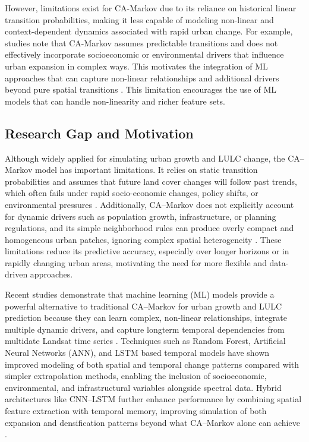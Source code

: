 \documentclass[main]{subfiles}
\begin{document}
However, limitations exist for CA-Markov due to its reliance on historical linear transition probabilities, making it less capable of modeling non-linear and context-dependent dynamics associated with rapid urban change. For example, studies note that CA-Markov assumes predictable transitions and does not effectively incorporate socioeconomic or environmental drivers that influence urban expansion in complex ways. This motivates the integration of ML approaches that can capture non-linear relationships and additional drivers beyond pure spatial transitions \cite{ZHAO2024129}.
This limitation encourages the use of ML models that can handle non-linearity and richer feature sets.

\subsection*{Research Gap and Motivation}

Although widely applied for simulating urban growth and LULC change, the CA–Markov model has important limitations. It relies on static transition probabilities and assumes that future land cover changes will follow past trends, which often fails under rapid socio-economic changes, policy shifts, or environmental pressures \cite{ZHAO2024129}. Additionally, CA–Markov does not explicitly account for dynamic drivers such as population growth, infrastructure, or planning regulations, and its simple neighborhood rules can produce overly compact and homogeneous urban patches, ignoring complex spatial heterogeneity \cite{10.11648/j.ajese.20250904.12}. These limitations reduce its predictive accuracy, especially over longer horizons or in rapidly changing urban areas, motivating the need for more flexible and data-driven approaches.

Recent studies demonstrate that machine learning (ML) models provide a powerful alternative to traditional CA–Markov for urban growth and LULC prediction because they can learn complex, non-linear relationships, integrate multiple dynamic drivers, and capture long\textminus term temporal dependencies from multi\textminus date Landsat time series \cite{BOULILA2021101325}. Techniques such as Random Forest, Artificial Neural Networks (ANN), and LSTM based temporal models have shown improved modeling of both spatial and temporal change patterns compared with simpler extrapolation methods, enabling the inclusion of socio\textminus economic, environmental, and infrastructural variables alongside spectral data. Hybrid architectures like CNN–LSTM further enhance performance by combining spatial feature extraction with temporal memory, improving simulation of both expansion and densification patterns beyond what CA–Markov alone can achieve \cite{BOULILA2021101325}. 
\end{document}
